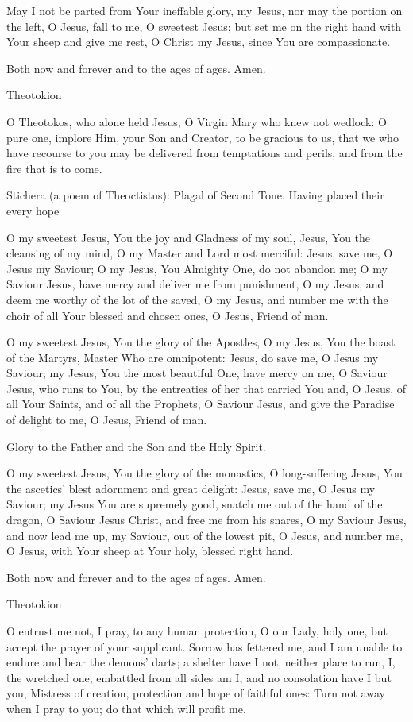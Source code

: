 May I not be parted from Your ineffable glory, my Jesus, nor may the
portion on the left, O Jesus, fall to me, O sweetest Jesus; but set me
on the right hand with Your sheep and give me rest, O Christ my Jesus,
since You are compassionate.

Both now and forever and to the ages of ages. Amen.

Theotokion

O Theotokos, who alone held Jesus, O Virgin Mary who knew not wedlock: O
pure one, implore Him, your Son and Creator, to be gracious to us, that
we who have recourse to you may be delivered from temptations and
perils, and from the fire that is to come.

Stichera (a poem of Theoctistus): Plagal of Second Tone. Having placed
their every hope

O my sweetest Jesus, You the joy and Gladness of my soul, Jesus, You the
cleansing of my mind, O my Master and Lord most merciful: Jesus, save
me, O Jesus my Saviour; O my Jesus, You Almighty One, do not abandon me;
O my Saviour Jesus, have mercy and deliver me from punishment, O my
Jesus, and deem me worthy of the lot of the saved, O my Jesus, and
number me with the choir of all Your blessed and chosen ones, O Jesus,
Friend of man.

O my sweetest Jesus, You the glory of the Apostles, O my Jesus, You the
boast of the Martyrs, Master Who are omnipotent: Jesus, do save me, O
Jesus my Saviour; my Jesus, You the most beautiful One, have mercy on
me, O Saviour Jesus, who runs to You, by the entreaties of her that
carried You and, O Jesus, of all Your Saints, and of all the Prophets, O
Saviour Jesus, and give the Paradise of delight to me, O Jesus, Friend
of man.

Glory to the Father and the Son and the Holy Spirit.

O my sweetest Jesus, You the glory of the monastics, O long-suffering
Jesus, You the ascetics' blest adornment and great delight: Jesus, save
me, O Jesus my Saviour; my Jesus You are supremely good, snatch me out
of the hand of the dragon, O Saviour Jesus Christ, and free me from his
snares, O my Saviour Jesus, and now lead me up, my Saviour, out of the
lowest pit, O Jesus, and number me, O Jesus, with Your sheep at Your
holy, blessed right hand.

Both now and forever and to the ages of ages. Amen.

Theotokion

O entrust me not, I pray, to any human protection, O our Lady, holy one,
but accept the prayer of your supplicant. Sorrow has fettered me, and I
am unable to endure and bear the demons' darts; a shelter have I not,
neither place to run, I, the wretched one; embattled from all sides am
I, and no consolation have I but you, Mistress of creation, protection
and hope of faithful ones: Turn not away when I pray to you; do that
which will profit me.

